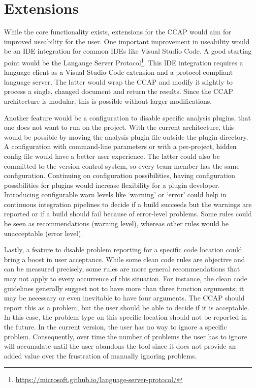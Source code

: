 \section{Extensions}
While the core functionality exists, extensions for the CCAP would aim for improved useability for the user. One important improvement in useability would be an IDE integration for common IDEs like Visual Studio Code. A good starting point would be the Langauge Server Protocol\footnote{\url{https://microsoft.github.io/language-server-protocol/}}. This IDE integration requires a language client as a Visual Studio Code extension and a protocol-compliant language server. The latter would wrap the CCAP and modify it slightly to process a single, changed document and return the results. Since the CCAP architecture is modular, this is possible without larger modifications. 

Another feature would be a configuration to disable specific analysis plugins, that one does not want to run on the project. With the current architecture, this would be possible by moving the analysis plugin file outside the plugin directory. A configuration with command-line parameters or with a per-project, hidden config file would have a better user experience. The latter could also be committed to the version control system, so every team member has the same configuration.
Continuing on configuration possibilities, having configuration possibilities for plugins would increase flexibility for a plugin developer. Introducing configurable warn levels like \enquote*{warning} or \enquote*{error} could help in continuous integration pipelines to decide if a build succeeds but the warnings are reported or if a build should fail because of error-level problems. Some rules could be seen as recommendations (warning level), whereas other rules would be unacceptable (error level).

Lastly, a feature to disable problem reporting for a specific code location could bring a boost in user acceptance. While some clean code rules are objective and can be measured precisely, some rules are more general recommendations that may not apply to every occurrence of this situation. For instance, the clean code guidelines generally suggest not to have more than three function arguments; it may be necessary or even inevitable to have four arguments. The CCAP should report this as a problem, but the user should be able to decide if it is acceptable. In this case, the problem type on this specific location should not be reported in the future. In the current version, the user has no way to ignore a specific problem. Consequently, over time the number of problems the user has to ignore will accumulate until the user abandons the tool since it does not provide an added value over the frustration of manually ignoring problems.

